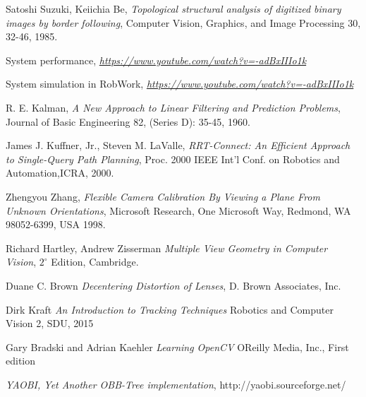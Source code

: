 \begin{thebibliography}{9}

	Satoshi Suzuki, Keiichia Be,
	\emph{Topological structural analysis of digitized binary images by border following},
	Computer Vision, Graphics, and Image Processing 30, 32-46,
	1985.

	System performance,
	\emph{\url{https://www.youtube.com/watch?v=-adBxIIIo1k}}
	
	System simulation in RobWork,
	\emph{\url{https://www.youtube.com/watch?v=-adBxIIIo1k}}

	R. E. Kalman,
	\emph{A New Approach to Linear Filtering and Prediction Problems},
	Journal of Basic Engineering 82, (Series D): 35-45,
	1960.

	James J. Kuffner, Jr., Steven M. LaValle,
	\emph{RRT-Connect: An Efficient Approach to Single-Query Path Planning},
	Proc. 2000 IEEE Int’l Conf. on Robotics and Automation,ICRA, 2000.

	Zhengyou Zhang,
	\emph{Flexible Camera Calibration By Viewing a Plane From Unknown Orientations},
	Microsoft Research, One Microsoft Way, Redmond, WA 98052-6399, USA
	1998.

	Richard Hartley, Andrew Zisserman
	\emph{Multiple View Geometry in Computer Vision},
	$2^{\circ}$ Edition, Cambridge.

	Duane C. Brown
	\emph{Decentering Distortion of Lenses},
	D. Brown Associates, Inc.

	Dirk Kraft
	\emph{An Introduction to Tracking Techniques}
	Robotics and Computer Vision 2, SDU, 2015

	Gary Bradski and Adrian Kaehler
	\emph{Learning OpenCV}
	OReilly Media, Inc., First edition

	\emph{YAOBI, Yet Another OBB-Tree implementation},
	http://yaobi.sourceforge.net/

\end{thebibliography}